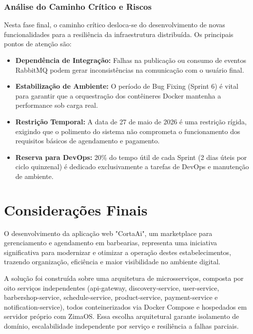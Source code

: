 \documentclass[
    12pt, 
    a4paper, 
    oneside, 
    chapter=TITLE, 
    section=TITLE
]{abntex2}
\begin{document}
\subsection{Análise do Caminho Crítico e Riscos}
Nesta fase final, o caminho crítico desloca-se do desenvolvimento de novas funcionalidades para a resiliência da infraestrutura distribuída. Os principais pontos de atenção são:
\begin{itemize}
    \item \textbf{Dependência de Integração:} Falhas na publicação ou consumo de eventos RabbitMQ podem gerar inconsistências na comunicação com o usuário final.
    \item \textbf{Estabilização de Ambiente:} O período de Bug Fixing (Sprint 6) é vital para garantir que a orquestração dos contêineres Docker mantenha a performance sob carga real.
    \item \textbf{Restrição Temporal:} A data de 27 de maio de 2026 é uma restrição rígida, exigindo que o polimento do sistema não comprometa o funcionamento dos requisitos básicos de agendamento e pagamento.
    \item \textbf{Reserva para DevOps:} 20\% do tempo útil de cada Sprint (2 dias úteis por ciclo quinzenal) é dedicado exclusivamente a tarefas de DevOps e manutenção de ambiente.
\end{itemize}

\chapter{Considerações Finais}
O desenvolvimento da aplicação web "CortaAi", um marketplace para gerenciamento e agendamento em barbearias, representa uma iniciativa significativa para modernizar e otimizar a operação destes estabelecimentos, trazendo organização, eficiência e maior visibilidade no ambiente digital.

A solução foi construída sobre uma arquitetura de microsserviços, composta por oito serviços independentes (api-gateway, discovery-service, user-service, barbershop-service, schedule-service, product-service, payment-service e notification-service), todos conteinerizados via Docker Compose e hospedados em servidor próprio com ZimaOS. Essa escolha arquitetural garante isolamento de domínio, escalabilidade independente por serviço e resiliência a falhas parciais.
\end{document}
